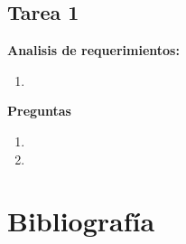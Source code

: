 \documentclass{report}
\begin{document}
	
	
	
	\begin{center}
		\section*{\LARGE{Tarea 1}}
	\end{center}

    \begin{center}
        \LARGE{\textbf{Analisis de requerimientos:}}\\
    \end{center}
        \normalsize
        \begin{enumerate}
            \item 
        \end{enumerate}


    \begin{center}
        \LARGE{\textbf{Preguntas}}\\
    \end{center}
    \normalsize
    \begin{enumerate}%
        \item 
        \item 
    \end{enumerate}
    \newpage
    
\newpage

\newpage
\Large \section*{Bibliografía}
    \printbibliography
  
\end{document}
